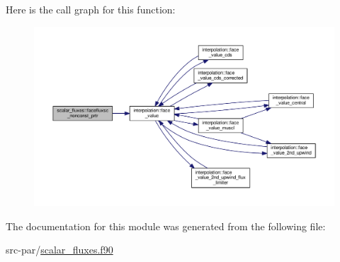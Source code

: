 Here is the call graph for this function\-:\nopagebreak
\begin{figure}[H]
\begin{center}
\leavevmode
\includegraphics[width=350pt]{classscalar__fluxes_a0c1a70ddcbcfb6baab6b6c4c8b9cb9ca_cgraph}
\end{center}
\end{figure}




The documentation for this module was generated from the following file\-:\begin{DoxyCompactItemize}
\item 
src-\/par/\hyperlink{scalar__fluxes_8f90}{scalar\-\_\-fluxes.\-f90}\end{DoxyCompactItemize}
